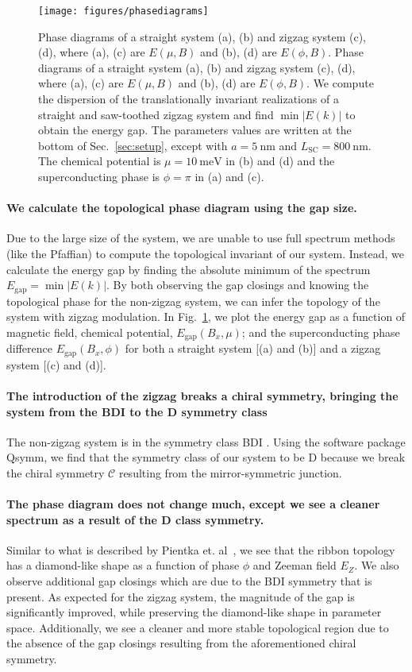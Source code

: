 \documentclass[english, twocolumn, 10pt, aps, superscriptaddress, floatfix, prb, citeautoscript]{revtex4-1}
\renewcommand{\comment}[2]{#2}
\renewcommand{\comment}{\paragraph}
\begin{document}
\begin{figure}[!htb]
\texttt{[image: figures/phasediagrams]}
\caption{Phase diagrams of a straight system (a), (b) and zigzag system (c), (d), where (a), (c) are $E(\mu, B)$ and (b), (d) are $E(\phi, B)$.
Phase diagrams of a straight system (a), (b) and zigzag system (c), (d), where (a), (c) are $E(\mu, B)$ and (b), (d) are $E(\phi, B)$.
We compute the dispersion of the translationally invariant realizations of a straight and saw-toothed zigzag system and find $\min \left| {E(k)} \right|$ to obtain the energy gap.
The parameters values are written at the bottom of Sec.~\ref{sec:setup}, except with $a=\SI{5}{\nm}$ and $L_\textrm{SC}=\SI{800}{\nm}$.
The chemical potential is $\mu=\SI{10}{\meV}$ in (b) and (d) and the superconducting phase is $\phi=\pi$ in (a) and (c).
\label{fig:phasediagrams}}
\end{figure}

\comment{We calculate the topological phase diagram using the gap size.}
Due to the large size of the system, we are unable to use full spectrum methods (like the Pfaffian) to compute the topological invariant of our system.
Instead, we calculate the energy gap by finding the absolute minimum of the spectrum $E_\textrm{gap}=\min{|E(k)|}$.
By both observing the gap closings and knowing the topological phase for the non-zigzag system, we can infer the topology of the system with zigzag modulation.
In Fig.~\ref{fig:phasediagrams}, we plot the energy gap as a function of magnetic field, chemical potential, $E_\textrm{gap}(B_x, \mu)$; and the superconducting phase difference $E_\textrm{gap}(B_x, \phi)$ for both a straight system [(a) and (b)] and a zigzag system [(c) and (d)].

\comment{The introduction of the zigzag breaks a chiral symmetry, bringing the system from the BDI to the D symmetry class}
The non-zigzag system is in the symmetry class BDI \cite{pientka2017topological}.
Using the software package Qsymm\cite{varjas2018qsymm}, we find that the symmetry class of our system to be D because we break the chiral symmetry $\mathcal{C}$ resulting from the mirror-symmetric junction.

\comment{The phase diagram does not change much, except we see a cleaner spectrum as a result of the D class symmetry.}
Similar to what is described by Pientka et. al~\cite{pientka2017topological}, we see that the ribbon topology has a diamond-like shape as a function of phase $\phi$ and Zeeman field $E_Z$.
We also observe additional gap closings which are due to the BDI symmetry that is present.
As expected for the zigzag system, the magnitude of the gap is significantly improved, while preserving the diamond-like shape in parameter space.
Additionally, we see a cleaner and more stable topological region due to the absence of the gap closings resulting from the aforementioned chiral symmetry.
\end{document}

